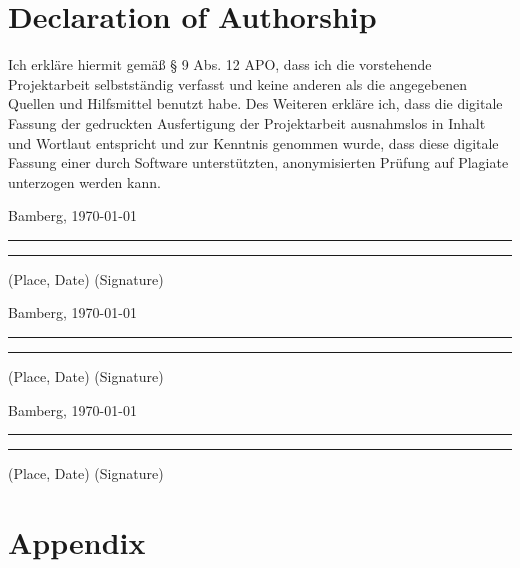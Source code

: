 \documentclass[a4paper]{article}
\begin{document}
{\parindent 0cm
\section*{Declaration of Authorship}
Ich erkläre hiermit gemäß § 9 Abs. 12 APO, dass ich die vorstehende Projektarbeit selbstständig verfasst und keine anderen als die angegebenen Quellen und Hilfsmittel benutzt habe. Des Weiteren erkläre ich, dass die digitale Fassung der gedruckten Ausfertigung der Projektarbeit ausnahmslos in Inhalt und Wortlaut entspricht und zur Kenntnis genommen wurde, dass diese digitale Fassung einer durch Software unterstützten, anonymisierten Prüfung auf Plagiate unterzogen werden kann.\\
\vspace{2\baselineskip}
  
Bamberg, \today

\rule[0.5em]{14em}{0.5pt} \hspace{0.25\linewidth}\rule[0.5em]{14em}{0.5pt}
\vspace{1em}
\hspace{4em} (Place, Date) \hspace{0.51\linewidth} (Signature)

Bamberg, \today

\rule[0.5em]{14em}{0.5pt} \hspace{0.25\linewidth}\rule[0.5em]{14em}{0.5pt}
\vspace{1em}
\hspace{4em} (Place, Date) \hspace{0.51\linewidth} (Signature)

Bamberg, \today

\rule[0.5em]{14em}{0.5pt} \hspace{0.25\linewidth}\rule[0.5em]{14em}{0.5pt}
\vspace{1em}
\hspace{4em} (Place, Date) \hspace{0.51\linewidth} (Signature)
}







\appendix

\section{Appendix}
\end{document}
